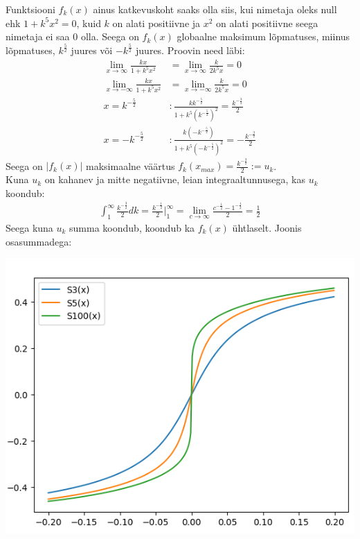 \documentclass{article}
\begin{document}
Funktsiooni $f_k(x)$ ainus katkevuskoht saaks olla siis, kui nimetaja oleks null ehk $1+k^5x^2=0$, kuid $k$ on alati positiivne ja $x^2$ on alati positiivne seega nimetaja ei saa 0 olla. Seega on $f_k(x)$ globaalne maksimum l\~opmatuses, miinus l\~opmatuses, $k^{\frac{5}{2}}$ juures v\~oi $-k^{\frac{5}{2}}$ juures. Proovin need l\"abi:
\begin{equation*}
\begin{aligned}
\lim_{x\to\infty}\frac{kx}{1+k^5x^2}&=\lim_{x\to\infty}\frac{k}{2k^5x}=0\\
\lim_{x\to-\infty}\frac{kx}{1+k^5x^2}&=\lim_{x\to-\infty}\frac{k}{2k^5x}=0\\
x=k^{-\frac{5}{2}}&: \frac{kk^{-\frac{5}{2}}}{1+k^5(k^{-\frac{5}{2}})^2}=\frac{k^{-\frac{3}{2}}}{2}\\
x=-k^{-\frac{5}{2}}&: \frac{k(-k^{-\frac{5}{2}})}{1+k^5(-k^{-\frac{5}{2}})^2}=-\frac{k^{-\frac{3}{2}}}{2}
\end{aligned}
\end{equation*}
Seega on $|f_k(x)|$ maksimaalne v\"a\"artus $f_k(x_{max})=\frac{k^{-\frac{3}{2}}}{2}:=u_k$.\\
Kuna $u_k$ on kahanev ja mitte negatiivne, leian integraaltunnusega, kas $u_k$ koondub:
\begin{equation*}
\begin{aligned}
\int_1^\infty\frac{k^{-\frac{3}{2}}}{2}dk=\frac{k^{-\frac{1}{2}}}{2}\Big|_1^\infty=\lim_{c\to\infty}\frac{c^{-\frac{1}{2}}-1^{-\frac{1}{2}}}{2}=\frac{1}{2}
\end{aligned}
\end{equation*}
Seega kuna $u_k$ summa koondub, koondub ka $f_k(x)$ \"uhtlaselt.
Joonis osasummadega:\\
\begin{center}
\includegraphics[scale=0.5]{graaf.png}
\end{center}
\end{document}
